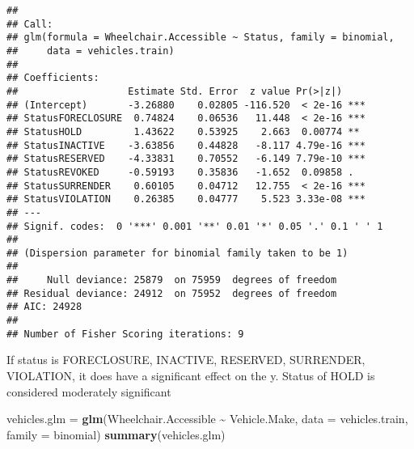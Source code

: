 \documentclass[
]{article}
\newenvironment{Shaded}{\begin{snugshade}}{\end{snugshade}}
\newcommand{\AttributeTok}[1]{\textcolor[rgb]{0.13,0.29,0.53}{#1}}
\newcommand{\FunctionTok}[1]{\textcolor[rgb]{0.13,0.29,0.53}{\textbf{#1}}}
\newcommand{\NormalTok}[1]{#1}
\newcommand{\OtherTok}[1]{\textcolor[rgb]{0.56,0.35,0.01}{#1}}
\newcommand{\SpecialCharTok}[1]{\textcolor[rgb]{0.81,0.36,0.00}{\textbf{#1}}}
\begin{document}
\begin{verbatim}
## 
## Call:
## glm(formula = Wheelchair.Accessible ~ Status, family = binomial, 
##     data = vehicles.train)
## 
## Coefficients:
##                   Estimate Std. Error  z value Pr(>|z|)    
## (Intercept)       -3.26880    0.02805 -116.520  < 2e-16 ***
## StatusFORECLOSURE  0.74824    0.06536   11.448  < 2e-16 ***
## StatusHOLD         1.43622    0.53925    2.663  0.00774 ** 
## StatusINACTIVE    -3.63856    0.44828   -8.117 4.79e-16 ***
## StatusRESERVED    -4.33831    0.70552   -6.149 7.79e-10 ***
## StatusREVOKED     -0.59193    0.35836   -1.652  0.09858 .  
## StatusSURRENDER    0.60105    0.04712   12.755  < 2e-16 ***
## StatusVIOLATION    0.26385    0.04777    5.523 3.33e-08 ***
## ---
## Signif. codes:  0 '***' 0.001 '**' 0.01 '*' 0.05 '.' 0.1 ' ' 1
## 
## (Dispersion parameter for binomial family taken to be 1)
## 
##     Null deviance: 25879  on 75959  degrees of freedom
## Residual deviance: 24912  on 75952  degrees of freedom
## AIC: 24928
## 
## Number of Fisher Scoring iterations: 9
\end{verbatim}

If status is FORECLOSURE, INACTIVE, RESERVED, SURRENDER, VIOLATION, it
does have a significant effect on the y. Status of HOLD is considered
moderately significant

\begin{Shaded}
\begin{Highlighting}[]
\NormalTok{vehicles.glm }\OtherTok{=} \FunctionTok{glm}\NormalTok{(Wheelchair.Accessible }\SpecialCharTok{\textasciitilde{}}\NormalTok{ Vehicle.Make, }\AttributeTok{data =}\NormalTok{ vehicles.train, }
                   \AttributeTok{family =}\NormalTok{ binomial)}
\FunctionTok{summary}\NormalTok{(vehicles.glm)}
\end{Highlighting}
\end{Shaded}
\end{document}
